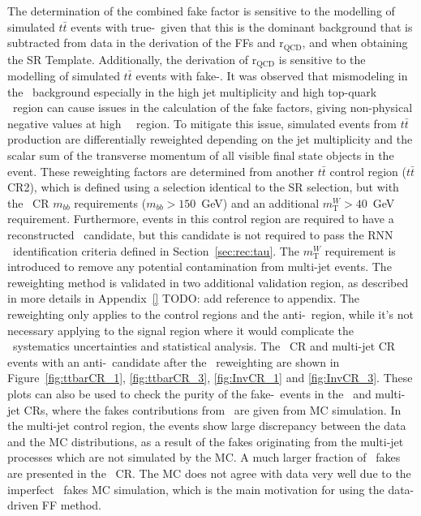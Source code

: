 The determination of the combined fake factor 
is sensitive to the modelling of simulated $t\bar{t}$ events with true-\tauhad\
given that this is the dominant background that is subtracted from data in the derivation of
the FFs and $\mathrm{r}_\text{QCD}$, and when obtaining the SR Template. Additionally, the derivation
of $\mathrm{r}_\text{QCD}$ is sensitive to the modelling of simulated $t\bar{t}$ events with fake-\tauhad.
It was observed that mismodeling in the \ttbar\ background 
especially in the high jet multiplicity and high top-quark \pt\ region
can cause issues in the calculation of the fake factors, 
giving non-physical negative values at high \tauhad\ \pt\ region. 
To mitigate this issue,
simulated events from $t\bar{t}$ production are differentially reweighted
depending on the jet multiplicity and the scalar sum of the transverse momentum of all visible
final state objects in the event.
These reweighting factors are determined from another $t\bar{t}$ control region ($t\bar{t}$ CR2),
which is defined using a selection identical to the SR selection,
but with the \ttbar\ CR $m_{bb}$ requirements ($m_{bb}>150$~GeV)
and an additional $m^{W}_\text{T}>40$~GeV requirement. 
Furthermore, events in this control region are required
to have a reconstructed \tauhad\ candidate, but this candidate is not required
to pass the RNN \tauhad\ identification criteria defined in Section~\ref{sec:rec:tau}.
The $m^{W}_\text{T}$ requirement is introduced to remove any potential contamination from multi-jet events.
The reweighting method is validated in two additional validation region, as described in more details in
Appendix~\ref{} TODO: add reference to appendix. 
The reweighting only applies to the control regions and the anti-\tauhad\ region, 
while it's not necessary applying to the signal region 
where it would complicate the \ttbar\ systematics uncertainties and statistical analysis.
The \ttbar\ CR and multi-jet CR events with an anti-\tauhad\ candidate after the \ttbar\ reweighting 
are shown in Figure~\ref{fig:ttbarCR_1}, \ref{fig:ttbarCR_3}, \ref{fig:InvCR_1} and \ref{fig:InvCR_3}.
These plots can also be used to check the purity of the fake-\tauhad\ events in the \ttbar\ and multi-jet CRs,  
where the fakes contributions from \ttbar\ are given from MC simulation.
In the multi-jet control region, the events show large discrepancy between the
data and the MC distributions, as a result of the fakes originating from the 
multi-jet processes which are not simulated by the MC. 
A much larger fraction of \ttbar\ fakes are presented in the \ttbar\ CR. 
The MC does not agree with data very well due to the imperfect \ttbar\ fakes MC simulation,
which is the main motivation for using the data-driven FF method. 

